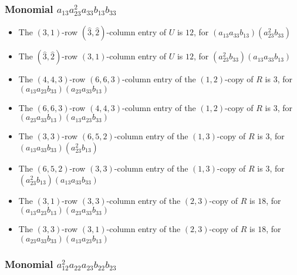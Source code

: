 \documentclass{article}
\begin{document}
\subsubsection{Monomial $ a_{13} a_{23}^{2} a_{33} b_{13} b_{33} $}

\begin{itemize}
\item The $ \left(3, 1\right) $-row $ (\hat{3}, \hat{2}) $-column entry of $U$ is $ 12 $, for $( a_{13} a_{33} b_{13} )( a_{23}^{2} b_{33} )$ 
\item The $(\hat{3}, \hat{2})$-row $ \left(3, 1\right) $-column entry of $U$ is $ 12 $, for $( a_{23}^{2} b_{33} )( a_{13} a_{33} b_{13} )$ 
\item The $(4, 4, 3)$-row $(6, 6, 3)$-column entry of the $ \left(1, 2\right) $-copy of $R$ is $ 3 $, for $( a_{13} a_{23} b_{33} )( a_{23} a_{33} b_{13} )$ 
\item The $(6, 6, 3)$-row $(4, 4, 3)$-column entry of the $ \left(1, 2\right) $-copy of $R$ is $ 3 $, for $( a_{23} a_{33} b_{13} )( a_{13} a_{23} b_{33} )$ 
\item The $(3, 3)$-row $(6, 5, 2)$-column entry of the $ \left(1, 3\right) $-copy of $R$ is $ 3 $, for $( a_{13} a_{33} b_{33} )( a_{23}^{2} b_{13} )$ 
\item The $(6, 5, 2)$-row $(3, 3)$-column entry of the $ \left(1, 3\right) $-copy of $R$ is $ 3 $, for $( a_{23}^{2} b_{13} )( a_{13} a_{33} b_{33} )$ 
\item The $(3, 1)$-row $(3, 3)$-column entry of the $ \left(2, 3\right) $-copy of $R$ is $ 18 $, for $( a_{13} a_{23} b_{13} )( a_{23} a_{33} b_{33} )$ 
\item The $(3, 3)$-row $(3, 1)$-column entry of the $ \left(2, 3\right) $-copy of $R$ is $ 18 $, for $( a_{23} a_{33} b_{33} )( a_{13} a_{23} b_{13} )$ 
\end{itemize}
\subsubsection{Monomial $ a_{12}^{2} a_{22} a_{23} b_{22} b_{23} $}
\end{document}
